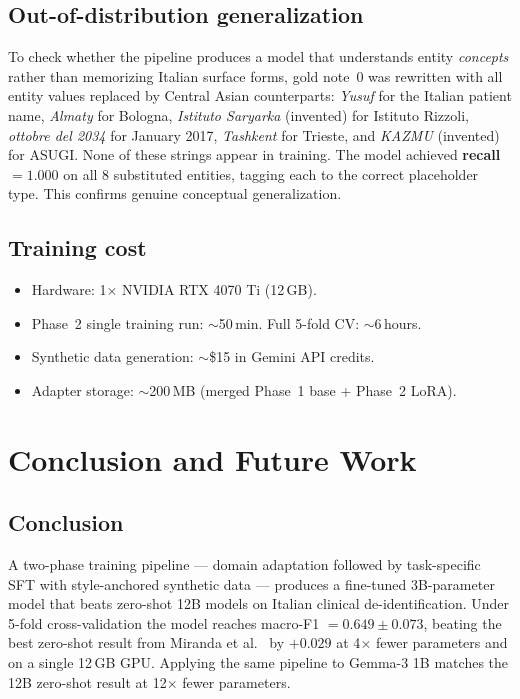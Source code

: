 \documentclass[11pt,a4paper]{article}
\begin{document}
\subsection{Out-of-distribution generalization}

To check whether the pipeline produces a model that understands entity \textit{concepts} rather than memorizing Italian surface forms, gold note~0 was rewritten with all entity values replaced by Central Asian counterparts: \textit{Yusuf} for the Italian patient name, \textit{Almaty} for Bologna, \textit{Istituto Saryarka} (invented) for Istituto Rizzoli, \textit{ottobre del 2034} for January 2017, \textit{Tashkent} for Trieste, and \textit{KAZMU} (invented) for ASUGI. None of these strings appear in training. The model achieved \textbf{recall $= 1.000$} on all 8 substituted entities, tagging each to the correct placeholder type. This confirms genuine conceptual generalization.

\subsection{Training cost}

\begin{itemize}[leftmargin=*,topsep=2pt,itemsep=0pt]
  \item Hardware: 1$\times$ NVIDIA RTX 4070 Ti (12\,GB).
  \item Phase~2 single training run: $\sim$50\,min. Full 5-fold CV: $\sim$6\,hours.
  \item Synthetic data generation: $\sim$\$15 in Gemini API credits.
  \item Adapter storage: $\sim$200\,MB (merged Phase~1 base + Phase~2 LoRA).
\end{itemize}

\section{Conclusion and Future Work}
\label{sec:conclusion}

\subsection{Conclusion}

A two-phase training pipeline — domain adaptation followed by task-specific SFT with style-anchored synthetic data — produces a fine-tuned 3B-parameter model that beats zero-shot 12B models on Italian clinical de-identification. Under 5-fold cross-validation the model reaches macro-F1 $= 0.649 \pm 0.073$, beating the best zero-shot result from Miranda et al.\ \cite{miranda2025mamma} by $+0.029$ at 4$\times$ fewer parameters and on a single 12\,GB GPU. Applying the same pipeline to Gemma-3 1B matches the 12B zero-shot result at 12$\times$ fewer parameters.
\end{document}
